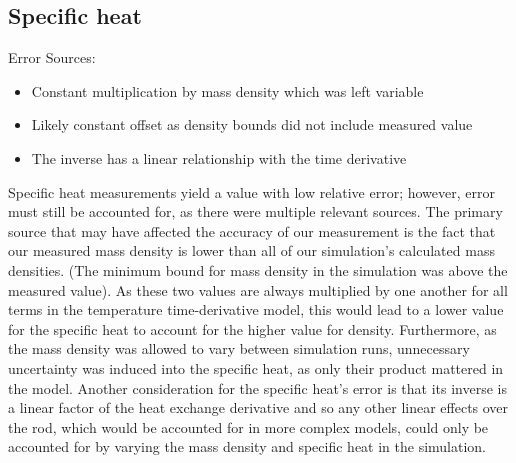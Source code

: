 \documentclass[letterpaper,titlepage,oneside]{report}
\begin{document}
\subsection*{Specific heat}
Error Sources:
\begin{itemize}
\item Constant multiplication by mass density which was left variable
\item Likely constant offset as density bounds did not include measured value
\item The inverse has a linear relationship with the time derivative
\end{itemize}
Specific heat measurements yield a value with low relative error;
however, error must still be accounted for, as there were multiple
relevant sources. The primary source that may have affected
the accuracy of our measurement is the fact that our measured
mass density is lower than all of our simulation's calculated mass
densities. (The minimum bound for mass density in the simulation
was above the measured value). As these two values are always
multiplied by one another for all terms in the temperature
time-derivative model, this would lead to a lower value for the
specific heat to account for the higher value for density.
Furthermore, as the mass density was allowed to vary between
simulation runs, unnecessary uncertainty was induced into the
specific heat, as only their product mattered in the model.
Another consideration for the specific heat's error is that its
inverse is a linear factor of the heat exchange derivative and
so any other linear effects over the rod, which would be
accounted for in more complex models, could only be accounted
for by varying the mass density and specific heat in the simulation.
\end{document}
